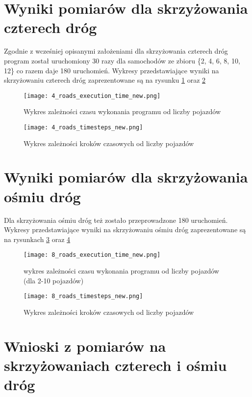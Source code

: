 \section{Wyniki pomiarów dla skrzyżowania czterech dróg}

Zgodnie z wcześniej opisanymi założeniami dla skrzyżowania czterech dróg program został uruchomiony 30 razy dla samochodów ze zbioru \{2, 4, 6, 8, 10, 12\} co razem daje 180 uruchomień.
\newline
\newline
Wykresy przedstawiające wyniki na skrzyżowaniu czterech dróg zaprezentowane są na rysunku \ref{4_roads_execution_time_new} oraz \ref{four-roads-crossroads-timesteps}
\begin{figure}[H]
  \centering
  \texttt{[image: 4\_roads\_execution\_time\_new.png]}
  \caption{Wykres zależności czasu wykonania programu od liczby pojazdów}
  \label{4_roads_execution_time_new}
\end{figure}
\begin{figure}[H]
  \centering
  \texttt{[image: 4\_roads\_timesteps\_new.png]}
  \caption{Wykres zależności kroków czasowych od liczby pojazdów}
  \label{four-roads-crossroads-timesteps}
\end{figure}

\section{Wyniki pomiarów dla skrzyżowania ośmiu dróg}

Dla skrzyżowania ośmiu dróg też zostało przeprowadzone 180 uruchomień.
\newline
\newline
Wykresy przedstawiające wyniki na skrzyżowaniu ośmiu dróg zaprezentowane są na rysunkach \ref{8_roads_execution_time_new} oraz \ref{8_roads_timesteps_new}
\begin{figure}[H]
  \centering
  \texttt{[image: 8\_roads\_execution\_time\_new.png]}
  \caption{wykres zależności czasu wykonania programu od liczby pojazdów (dla 2-10 pojazdów)}
  \label{8_roads_execution_time_new}
\end{figure}
\begin{figure}[H]
  \centering
  \texttt{[image: 8\_roads\_timesteps\_new.png]}
  \caption{Wykres zależności kroków czasowych od liczby pojazdów}
  \label{8_roads_timesteps_new}
\end{figure}

\section{Wnioski z pomiarów na skrzyżowaniach czterech i ośmiu dróg}

